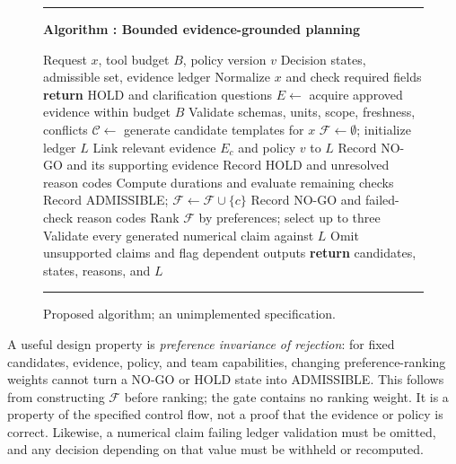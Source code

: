 \documentclass[conference]{IEEEtran}
\newcounter{paperalgorithm}
\begin{document}
\begin{figure}[t]
\centering
\begin{minipage}{0.97\columnwidth}
\hrule\vspace{3pt}
\label{alg:gate}
\textbf{Algorithm \thepaperalgorithm: Bounded evidence-grounded planning}\par
\begin{algorithmic}[1]
\REQUIRE Request $x$, tool budget $B$, policy version $v$
\ENSURE Decision states, admissible set, evidence ledger
\STATE Normalize $x$ and check required fields
\STATE \textbf{return} HOLD and clarification questions
\ENDIF
\STATE $E\leftarrow$ acquire approved evidence within budget $B$
\STATE Validate schemas, units, scope, freshness, conflicts
\STATE $\mathcal C\leftarrow$ generate candidate templates for $x$
\STATE $\mathcal F\leftarrow\emptyset$; initialize ledger $L$
\STATE Link relevant evidence $E_c$ and policy $v$ to $L$
\STATE Record NO-GO and its supporting evidence
\STATE Record HOLD and unresolved reason codes
\ELSE
\STATE Compute durations and evaluate remaining checks
\STATE Record ADMISSIBLE; $\mathcal F\leftarrow\mathcal F\cup\{c\}$
\ELSE
\STATE Record NO-GO and failed-check reason codes
\ENDIF
\ENDIF
\ENDFOR
\STATE Rank $\mathcal F$ by preferences; select up to three
\STATE Validate every generated numerical claim against $L$
\STATE Omit unsupported claims and flag dependent outputs
\STATE \textbf{return} candidates, states, reasons, and $L$
\end{algorithmic}
\vspace{3pt}\hrule
\end{minipage}
\caption{Proposed algorithm; an unimplemented specification.}
\end{figure}

A useful design property is \emph{preference invariance of rejection}: for fixed candidates, evidence, policy, and team capabilities, changing preference-ranking weights cannot turn a NO-GO or HOLD state into ADMISSIBLE. This follows from constructing $\mathcal F$ before ranking; the gate contains no ranking weight. It is a property of the specified control flow, not a proof that the evidence or policy is correct. Likewise, a numerical claim failing ledger validation must be omitted, and any decision depending on that value must be withheld or recomputed.
\end{document}

